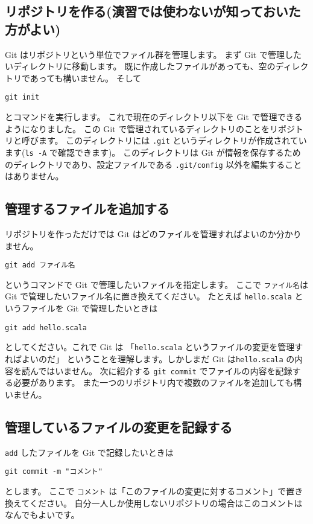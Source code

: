 \documentclass[a4paper,11pt, article]{memoir}
\begin{document}
\subsection{リポジトリを作る(演習では使わないが知っておいた方がよい)}
Git はリポジトリという単位でファイル群を管理します。
まず Git で管理したいディレクトリに移動します。
既に作成したファイルがあっても、空のディレクトリであっても構いません。
そして
\begin{verbatim}
git init
\end{verbatim}
とコマンドを実行します。
これで現在のディレクトリ以下を Git で管理できるようになりました。
この Git で管理されているディレクトリのことをリポジトリと呼びます。
このディレクトリには \texttt{.git} というディレクトリが作成されています(\texttt{ls -A} で確認できます)。
このディレクトリは Git が情報を保存するためのディレクトリであり、設定ファイルである \texttt{.git/config} 以外を編集することはありません。

\subsection{管理するファイルを追加する}
リポジトリを作っただけでは Git はどのファイルを管理すればよいのか分かりません。
\begin{verbatim}
git add ファイル名
\end{verbatim}
というコマンドで Git で管理したいファイルを指定します。
ここで \texttt{ファイル名}は Git で管理したいファイル名に置き換えてください。
たとえば \texttt{hello.scala} というファイルを Git で管理したいときは
\begin{verbatim}
git add hello.scala
\end{verbatim}
としてください。これで Git は 「\texttt{hello.scala} というファイルの変更を管理すればよいのだ」
ということを理解します。しかしまだ Git は\texttt{hello.scala} の内容を読んではいません。
次に紹介する \texttt{git commit} でファイルの内容を記録する必要があります。
また一つのリポジトリ内で複数のファイルを追加しても構いません。


\subsection{管理しているファイルの変更を記録する}
\texttt{add} したファイルを Git で記録したいときは
\begin{verbatim}
git commit -m "コメント"
\end{verbatim}
とします。
ここで \texttt{コメント} は「このファイルの変更に対するコメント」で置き換えてください。
自分一人しか使用しないリポジトリの場合はこのコメントはなんでもよいです。
\end{document}
